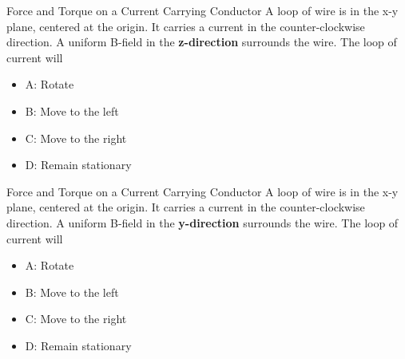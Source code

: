 \documentclass{beamer}
\begin{document}
\begin{frame}{Force and Torque on a Current Carrying Conductor}
A loop of wire is in the x-y plane, centered at the origin.  It carries a current in the counter-clockwise direction.  A uniform B-field in the \textbf{\alert{z-direction}} surrounds the wire.  The loop of current will
\begin{itemize}
\item A: Rotate
\item B: Move to the left
\item C: Move to the right
\item D: Remain stationary
\end{itemize}
\end{frame}

\begin{frame}{Force and Torque on a Current Carrying Conductor}
A loop of wire is in the x-y plane, centered at the origin.  It carries a current in the counter-clockwise direction.  A uniform B-field in the \textbf{\alert{y-direction}} surrounds the wire.  The loop of current will
\begin{itemize}
\item A: Rotate
\item B: Move to the left
\item C: Move to the right
\item D: Remain stationary
\end{itemize}
\end{frame}
\end{document}
